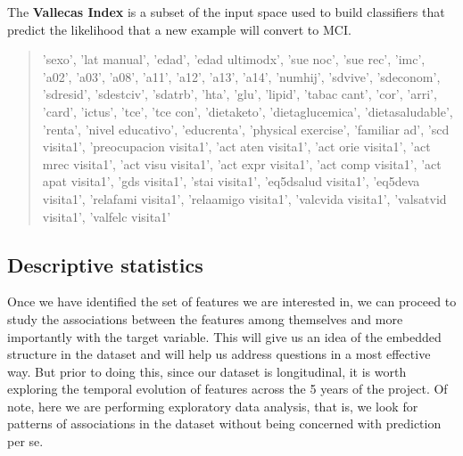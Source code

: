 \documentclass[11pt]{article}
\theoremstyle{definition}
\theoremstyle{remark}
\begin{document}
The \textbf{Vallecas Index} is a subset of the input space used to build classifiers that predict the likelihood that a new example will convert to MCI. 
\begin{quote}
'sexo', 'lat manual', 'edad', 'edad ultimodx', 'sue noc', 'sue rec', 'imc', 'a02', 'a03', 'a08', 'a11', 'a12', 'a13', 'a14', 'numhij', 'sdvive', 'sdeconom', 'sdresid', 'sdestciv', 'sdatrb', 'hta', 'glu', 'lipid', 'tabac cant', 'cor', 'arri', 'card', 'ictus', 'tce', 'tce con', 'dietaketo', 'dietaglucemica', 'dietasaludable', 'renta', 'nivel educativo', 'educrenta', 'physical exercise', 'familiar ad', 'scd visita1', 'preocupacion visita1', 'act aten visita1', 'act orie visita1', 'act mrec visita1', 'act visu visita1', 'act expr visita1', 'act comp visita1', 'act apat visita1', 'gds visita1', 'stai visita1', 'eq5dsalud visita1', 'eq5deva visita1', 'relafami visita1', 'relaamigo visita1', 'valcvida visita1', 'valsatvid visita1', 'valfelc visita1'
\end{quote}

\subsection{Descriptive statistics}
\label{sse:des}

Once we have identified the set of features we are interested in, we can proceed to study the associations between the features among themselves and more importantly with the target variable. This will give us an idea of the embedded structure in the dataset and will help us address questions in a most effective way. But prior to doing this, since our dataset is longitudinal, it is worth exploring the temporal evolution of features across the 5 years of the project. Of note, here we are performing exploratory data analysis, that is, we look for patterns of associations in the dataset without being concerned with prediction per se.
\end{document}
